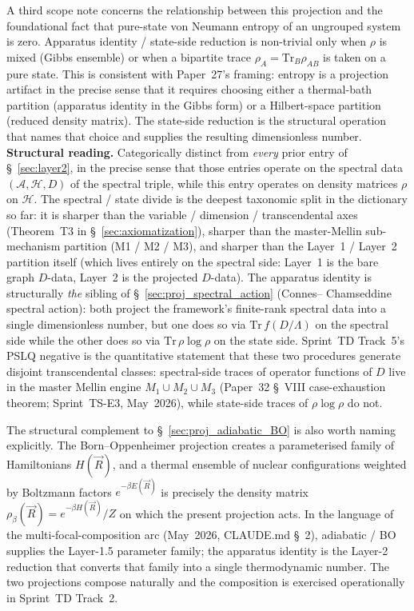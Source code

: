 \documentclass[11pt]{article}
\begin{document}
A third scope note concerns the relationship between this projection
and the foundational fact that pure-state von Neumann entropy of an
ungrouped system is zero.  Apparatus identity / state-side reduction
is non-trivial only when $\rho$ is mixed (Gibbs ensemble) or when a
bipartite trace $\rho_A = \mathrm{Tr}_B \rho_{AB}$ is taken on a pure
state.  This is consistent with Paper~27's framing: entropy is a
projection artifact in the precise sense that it requires choosing
either a thermal-bath partition (apparatus identity in the Gibbs
form) or a Hilbert-space partition (reduced density matrix).  The
state-side reduction is the structural operation that names that
choice and supplies the resulting dimensionless number.\\
\textbf{Structural reading.}  Categorically distinct from
\emph{every} prior entry of \S~\ref{sec:layer2}, in the precise
sense that those entries operate on the spectral data $(\mathcal{A},
\mathcal{H}, D)$ of the spectral triple, while this entry operates
on density matrices $\rho$ on $\mathcal{H}$.  The spectral / state
divide is the deepest taxonomic split in the dictionary so far: it
is sharper than the variable / dimension / transcendental axes
(Theorem~T3 in \S~\ref{sec:axiomatization}), sharper than
the master-Mellin sub-mechanism partition (M1 / M2 / M3), and sharper
than the Layer~1 / Layer~2 partition itself (which lives entirely on
the spectral side: Layer~1 is the bare graph $D$-data, Layer~2 is the
projected $D$-data).  The apparatus identity is structurally
\emph{the} sibling of \S~\ref{sec:proj_spectral_action} (Connes--%
Chamseddine spectral action): both project the framework's
finite-rank spectral data into a single dimensionless number, but
one does so via $\mathrm{Tr}\,f(D/\Lambda)$ on the spectral side
while the other does so via $\mathrm{Tr}\,\rho\log\rho$ on the
state side.  Sprint~TD Track~5's PSLQ negative is the quantitative
statement that these two procedures generate disjoint transcendental
classes: spectral-side traces of operator functions of $D$ live in
the master Mellin engine $M_1 \cup M_2 \cup M_3$ (Paper~32
\S~VIII case-exhaustion theorem; Sprint~TS-E3, May~2026), while
state-side traces of $\rho \log \rho$ do not.

The structural complement to \S~\ref{sec:proj_adiabatic_BO} is also
worth naming explicitly.  The Born--Oppenheimer projection creates a
parameterised family of Hamiltonians $H(\vec{R})$, and a thermal
ensemble of nuclear configurations weighted by Boltzmann factors
$e^{-\beta E(\vec{R})}$ is precisely the density matrix
$\rho_\beta(\vec{R}) = e^{-\beta H(\vec{R})}/Z$ on which the present
projection acts.  In the language of the multi-focal-composition arc
(May~2026, CLAUDE.md \S~2), adiabatic / BO supplies the Layer-1.5
parameter family; the apparatus identity is the Layer-2 reduction
that converts that family into a single thermodynamic number.  The
two projections compose naturally and the composition is exercised
operationally in Sprint~TD Track~2.
\end{document}
